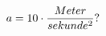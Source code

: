 \documentclass[preview]{standalone}
\begin{document}
\begin{align*}
\special{dvisvgm:raw <g id='unique000'>}a = 10 \cdot \frac{Meter}{sekunde^{2}} ?\special{dvisvgm:raw </g>}
\end{align*}
\end{document}
